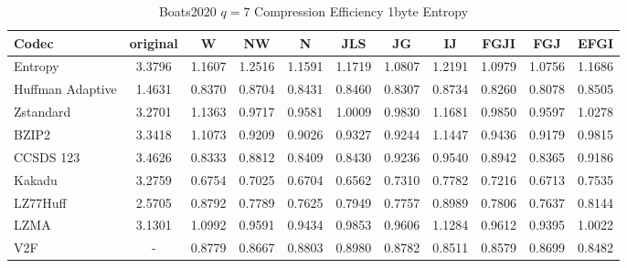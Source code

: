 \documentclass{article}
\begin{document}
\begin{table}[h!]
\centering
\caption{Boats2020 $q=7$ Compression Efficiency 1byte Entropy}
\begin{tabular}{|l|cccccccccc|}
\hline
Codec &  original &      W &     NW &      N &    JLS &     JG &     IJ &   FGJI &    FGJ &   EFGI \\
\hline
Entropy & 3.3796 & 1.1607 & 1.2516 & 1.1591 & 1.1719 & 1.0807 & 1.2191 & 1.0979 & 1.0756 & 1.1686 \\
\hline
Huffman Adaptive &    1.4631 & 0.8370 & 0.8704 & 0.8431 & 0.8460 & 0.8307 & 0.8734 & 0.8260 & 0.8078 & 0.8505 \\
Zstandard        &    3.2701 & 1.1363 & 0.9717 & 0.9581 & 1.0009 & 0.9830 & 1.1681 & 0.9850 & 0.9597 & 1.0278 \\
BZIP2            &    3.3418 & 1.1073 & 0.9209 & 0.9026 & 0.9327 & 0.9244 & 1.1447 & 0.9436 & 0.9179 & 0.9815 \\
CCSDS 123        &    3.4626 & 0.8333 & 0.8812 & 0.8409 & 0.8430 & 0.9236 & 0.9540 & 0.8942 & 0.8365 & 0.9186 \\
Kakadu           &    3.2759 & 0.6754 & 0.7025 & 0.6704 & 0.6562 & 0.7310 & 0.7782 & 0.7216 & 0.6713 & 0.7535 \\
LZ77Huff         &    2.5705 & 0.8792 & 0.7789 & 0.7625 & 0.7949 & 0.7757 & 0.8989 & 0.7806 & 0.7637 & 0.8144 \\
LZMA             &    3.1301 & 1.0992 & 0.9591 & 0.9434 & 0.9853 & 0.9606 & 1.1284 & 0.9612 & 0.9395 & 1.0022 \\
V2F              &    - & 0.8779 & 0.8667 & 0.8803 & 0.8980 & 0.8782 & 0.8511 & 0.8579 & 0.8699 & 0.8482 \\
\hline
\end{tabular}
\end{table}
\end{document}
